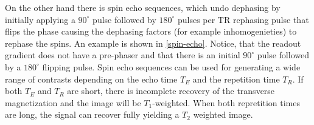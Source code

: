 On the other hand there is spin echo sequences, which undo dephasing by initially applying a $90^\circ$ pulse followed by $180^\circ$ pulses per TR rephasing pulse that flips the phase causing the dephasing factors (for example inhomogenieties) to rephase the spins.
An example is shown in \ref{spin-echo}.
Notice, that the readout gradient does not have a pre-phaser and that there is an initial $90^\circ$ pulse followed by a $180^\circ$ flipping pulse.
Spin echo sequences can be used for generating a wide range of contrasts depending on the echo time $T_E$ and the repetition time $T_R$.
If both $T_E$ and $T_R$ are short, there is incomplete recovery of the transverse magnetization and the image will be $T_1$-weighted.
When both repretition times are long, the signal can recover fully yielding a $T_2$ weighted image.

